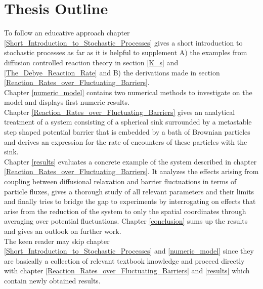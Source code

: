 \section{Thesis Outline}
To follow an educative approach chapter \ref{Short_Introduction_to_Stochastic_Processes} gives a short introduction to stochastic processes as far as it is helpful to supplement A) the examples from diffusion controlled reaction theory in section \ref{K_s} and \ref{The_Debye_Reaction_Rate} and B) the derivations made in section \ref{Reaction_Rates_over_Fluctuating_Barriers}. \\
Chapter \ref{numeric_model} contains two numerical methods to investigate on the model and displays first numeric results. \\
Chapter \ref{Reaction_Rates_over_Fluctuating_Barriers} gives an analytical treatment of a system consisting of a spherical sink surrounded by a metastable step shaped potential barrier that is embedded by a bath of Brownian particles and derives an expression for the rate of encounters of these particles with the sink. \\
Chapter \ref{results} evaluates a concrete example of the system described in chapter \ref{Reaction_Rates_over_Fluctuating_Barriers}. It analyzes the effects arising from coupling between diffusional relaxation and barrier fluctuations in terms of particle fluxes, gives a thorough study of all relevant parameters and their limits and finally tries to bridge the gap to experiments by interrogating on effects that arise from the reduction of the system to only the spatial coordinates through averaging over potential fluctuations. Chapter \ref{conclusion} sums up the results and gives an outlook on further work. \\

The keen reader may skip chapter \ref{Short_Introduction_to_Stochastic_Processes} and \ref{numeric_model} since they are basically a collection of relevant textbook knowledge and proceed directly with chapter \ref{Reaction_Rates_over_Fluctuating_Barriers} and \ref{results} which contain newly obtained results. 

